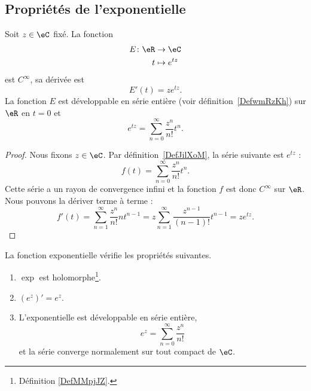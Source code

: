 \subsection{Propriétés de l'exponentielle}

\begin{proposition}
    Soit \( z\in\eC\) fixé. La fonction
    \begin{equation}
        \begin{aligned}
            E\colon \eR&\to \eC \\
            t&\mapsto  e^{tz}
        \end{aligned}
    \end{equation}
    est  \(  C^{\infty}\), sa dérivée est
    \begin{equation}
        E'(t)=z e^{tz}.
    \end{equation}
    La fonction \( E\) est développable en série entière (voir définition~\ref{DefwmRzKh}) sur \( \eR\) en \( t=0\) et
    \begin{equation}
        e^{tz}=\sum_{n=0}^{\infty}\frac{ z^n }{ n! }t^n.
    \end{equation}
\end{proposition}

\begin{proof}
    Nous fixons \( z\in \eC\). Par définition~\ref{DefJilXoM}, la série suivante est \(  e^{tz}\) :
    \begin{equation}
        f(t)=\sum_{n=0}^{\infty}\frac{ z^n }{ n! }t^n.
    \end{equation}
    Cette série a un rayon de convergence infini et la fonction \( f\) est donc \(  C^{\infty}\) sur \( \eR\). Nous pouvons la dériver terme à terme :
    \begin{equation}
            f'(t)=\sum_{n=1}^{\infty}\frac{ z^n }{ n! }nt^{n-1}
            =z\sum_{n=1}^{\infty}\frac{ z^{n-1} }{ (n-1)! }t^{n-1}
            =z e^{tz}.
    \end{equation}
\end{proof}

\begin{theorem}     \label{THOooNGOIooEECfAv}
    La fonction exponentielle vérifie les propriétés suivantes.
    \begin{enumerate}
        \item
            \( \exp\) est holomorphe\footnote{Définition \ref{DefMMpjJZ}.}.
        \item
            \( (e^z)'=e^z\).
        \item
            L'exponentielle est développable en série entière,
            \begin{equation}
                e^z=\sum_{n=0}^{\infty}\frac{ z^n }{ n! }
            \end{equation}
            et la série converge normalement sur tout compact de \( \eC\).
    \end{enumerate}
\end{theorem}

